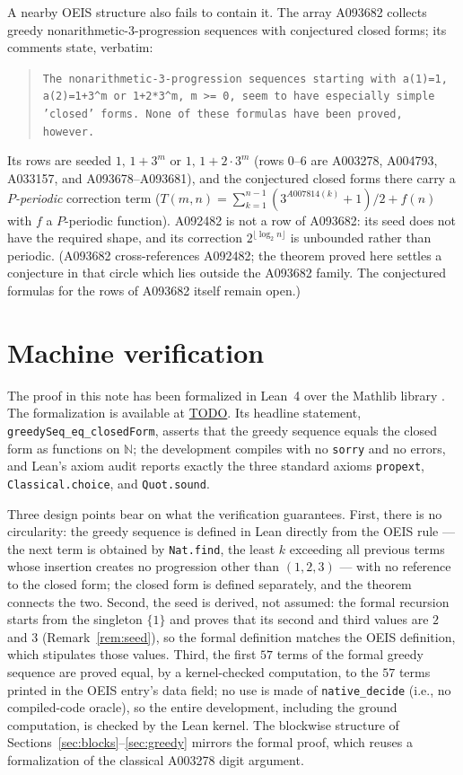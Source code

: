 \documentclass[12pt]{article}
\theoremstyle{plain}
\theoremstyle{definition}
\theoremstyle{remark}
\newcommand{\N}{\mathbb{N}}
\begin{document}
A nearby OEIS structure also fails to contain it.  The array
A093682 collects greedy nonarithmetic-$3$-progression sequences
with conjectured closed forms; its comments state, verbatim:

\begin{quote}
\texttt{The nonarithmetic-3-progression sequences starting with
a(1)=1, a(2)=1+3\textasciicircum m or 1+2*3\textasciicircum m, m
>= 0, seem to have especially simple 'closed' forms. None of
these formulas have been proved, however.}
\end{quote}

\noindent Its rows are seeded $1,\,1+3^m$ or $1,\,1+2\cdot 3^m$
(rows $0$--$6$ are A003278, A004793, A033157, and
A093678--A093681), and the conjectured closed forms there carry a
\emph{$P$-periodic} correction term ($T(m,n)=\sum_{k=1}^{n-1}
(3^{A007814(k)}+1)/2+f(n)$ with $f$ a $P$-periodic function).
A092482 is not a row of A093682: its seed does not have the
required shape, and its correction $2^{\lfloor\log_2 n\rfloor}$
is unbounded rather than periodic.  (A093682 cross-references
A092482; the theorem proved here settles a conjecture in that
circle which lies outside the A093682 family.  The conjectured
formulas for the rows of A093682 itself remain open.)

\section{Machine verification}\label{sec:lean}

The proof in this note has been formalized in Lean~4
\cite{Lean4} over the Mathlib library \cite{mathlib}.  The
formalization is available at \url{TODO}.  Its headline statement,
\texttt{greedySeq\_eq\_closedForm}, asserts that the greedy
sequence equals the closed form as functions on $\N$; the
development compiles with no \texttt{sorry} and no errors, and
Lean's axiom audit reports exactly the three standard axioms
\texttt{propext}, \texttt{Classical.choice}, and
\texttt{Quot.sound}.

Three design points bear on what the verification guarantees.
First, there is no circularity: the greedy sequence is defined in
Lean directly from the OEIS rule --- the next term is obtained by
\texttt{Nat.find}, the least $k$ exceeding all previous terms
whose insertion creates no progression other than $(1,2,3)$ ---
with no reference to the closed form; the closed form is defined
separately, and the theorem connects the two.  Second, the seed
is derived, not assumed: the formal recursion starts from the
singleton $\{1\}$ and proves that its second and third values are
$2$ and $3$ (Remark~\ref{rem:seed}), so the formal definition
matches the OEIS definition, which stipulates those values.
Third, the first $57$ terms of the formal greedy sequence are
proved equal, by a kernel-checked computation, to the $57$ terms
printed in the OEIS entry's data field; no use is made of
\texttt{native\_decide} (i.e., no compiled-code oracle), so the
entire development, including the ground computation, is checked
by the Lean kernel.  The blockwise structure of
Sections~\ref{sec:blocks}--\ref{sec:greedy} mirrors the formal
proof, which reuses a formalization of the classical A003278
digit argument.
\end{document}
